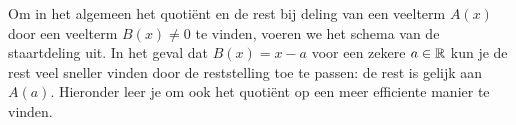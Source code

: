 \documentclass{ximera}
\begin{document}
	\author{Koen De Naeghel}
	\label{xim:veeltermen_schema_van_horner}

\newcommand{\tikzit}[2][\width]{%
\begin{image}[#1]
    \tikzitinline{#2}
\end{image}%
}


\providecommand{\tikzexportScale}[1][1.5]{
\iftikzexport
\tikzset{every picture/.append style={scale=#1, transform shape}}
\fi
}


\providecommand{\tikzitOptions}{}
\iftikzexport
\renewcommand{\tikzitOptions}{[scale=1.5, transform shape]}
\fi

\newcommand{\tikzitinline}[2][0.1]{
\begin{tikzpicture}
    \node (a) {#2};
    \path (current bounding box.south west) ++(-0.0,-0.0) coordinate (newSW);
    \path (current bounding box.north east) ++(#1,#1) coordinate (newNE);
    \useasboundingbox (newSW) rectangle (newNE);
\end{tikzpicture}

}  



Om in het algemeen het quoti\"ent en de rest bij deling van een veelterm $A(x)$ door een veelterm $B(x) \neq 0$ te vinden, voeren we het schema van de staartdeling uit. In het geval dat $B(x) = x-a$ voor een zekere $a \in \mathbb{R}$ kun je de rest veel sneller vinden door de reststelling toe te passen: de rest is gelijk aan $A(a)$. Hieronder leer je om ook het quoti\"ent op een meer efficiente manier te vinden. 
\end{document}
